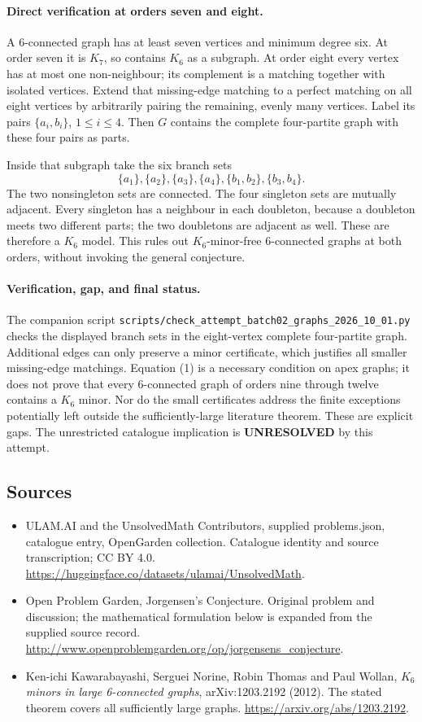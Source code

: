 \documentclass[11pt,a4paper]{article}
\begin{document}
\paragraph{Direct verification at orders seven and eight.}
A 6-connected graph has at least seven vertices and minimum degree six. At order seven it is $K_7$, so contains $K_6$ as a subgraph. At order eight every vertex has at most one non-neighbour; its complement is a matching together with isolated vertices. Extend that missing-edge matching to a perfect matching on all eight vertices by arbitrarily pairing the remaining, evenly many vertices. Label its pairs $\{a_i,b_i\}$, $1\le i\le4$. Then $G$ contains the complete four-partite graph with these four pairs as parts.

Inside that subgraph take the six branch sets
\[
 \{a_1\},\{a_2\},\{a_3\},\{a_4\},
 \{b_1,b_2\},\{b_3,b_4\}.
\]
The two nonsingleton sets are connected. The four singleton sets are mutually adjacent. Every singleton has a neighbour in each doubleton, because a doubleton meets two different parts; the two doubletons are adjacent as well. These are therefore a $K_6$ model. This rules out $K_6$-minor-free 6-connected graphs at both orders, without invoking the general conjecture.

\paragraph{Verification, gap, and final status.}
The companion script \texttt{scripts/check\_attempt\_batch02\_graphs\_2026\_10\_01.py} checks the displayed branch sets in the eight-vertex complete four-partite graph. Additional edges can only preserve a minor certificate, which justifies all smaller missing-edge matchings. Equation (1) is a necessary condition on apex graphs; it does not prove that every 6-connected graph of orders nine through twelve contains a $K_6$ minor. Nor do the small certificates address the finite exceptions potentially left outside the sufficiently-large literature theorem. These are explicit gaps. The unrestricted catalogue implication is \textbf{UNRESOLVED} by this attempt.

\subsection{Sources}
\begin{itemize}
\item[S1] ULAM.AI and the UnsolvedMath Contributors, supplied problems.json, catalogue entry, OpenGarden collection. Catalogue identity and source transcription; CC BY 4.0.
\url{https://huggingface.co/datasets/ulamai/UnsolvedMath}.
\item[S2] Open Problem Garden, Jorgensen's Conjecture. Original problem and discussion; the mathematical formulation below is expanded from the supplied source record.
\url{http://www.openproblemgarden.org/op/jorgensens_conjecture}.
\item[S3] Ken-ichi Kawarabayashi, Serguei Norine, Robin Thomas and Paul Wollan, \emph{$K_6$ minors in large 6-connected graphs}, arXiv:1203.2192 (2012). The stated theorem covers all sufficiently large graphs.
\url{https://arxiv.org/abs/1203.2192}.
\end{itemize}
\end{document}
